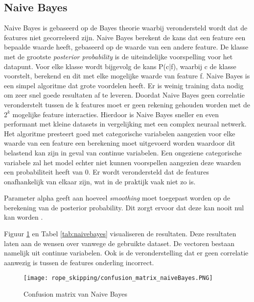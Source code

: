 \subsection{Naive Bayes}
Naive Bayes is gebaseerd op de Bayes theorie waarbij verondersteld wordt dat de features niet gecorreleerd zijn. 
Naive Bayes berekent de kans dat een feature een bepaalde waarde heeft, gebaseerd op de waarde van een andere feature. 
De klasse met de grootste \textit{posterior probability} is de uiteindelijke voorspelling voor het datapunt. 
Voor elke klasse wordt bijgevolg de kans P(c|f), waarbij c de klasse voorstelt, berekend en dit met elke mogelijke waarde van feature f. 
Naive Bayes is een simpel algoritme dat grote voordelen heeft. 
Er is weinig training data nodig om zeer snel goede resultaten af te leveren. Doordat Naive Bayes geen correlatie veronderstelt tussen de k features moet er geen rekening gehouden worden met de \(2^k\) mogelijke feature interacties.
Hierdoor is Naive Bayes sneller en even performant met kleine datasets in vergelijking met een complex neuraal netwerk. 
Het algoritme presteert goed met categorische variabelen aangezien voor elke waarde van een feature een berekening moet uitgevoerd worden waardoor dit belastend kan zijn in geval van continue variabelen. 
Een ongeziene categorische variabele zal het model echter niet kunnen voorspellen aangezien deze waarden een probabiliteit heeft van 0. 
Er wordt verondersteld dat de features onafhankelijk van elkaar zijn, wat in de praktijk vaak niet zo is.

Parameter alpha geeft aan hoeveel \textit{smoothing} moet toegepast worden op de berekening van de posterior probability. Dit zorgt ervoor dat deze kan nooit nul kan worden \cite{ref37} \cite{ref38}.

Figuur \ref{fig:naive_bayes} en Tabel \ref{tab:naivebayes} visualiseren de resultaten. Deze resultaten laten aan de wensen over vanwege de gebruikte dataset. De vectoren bestaan namelijk uit continue variabelen. Ook is de veronderstelling dat er geen correlatie aanwezig is tussen de features onderling incorrect.

\begin{figure}[!htpd]
\centering
\caption{Confusion matrix van Naive Bayes}\label{fig:naive_bayes}
\texttt{[image: rope\_skipping/confusion\_matrix\_naiveBayes.PNG]}  
\end{figure}

